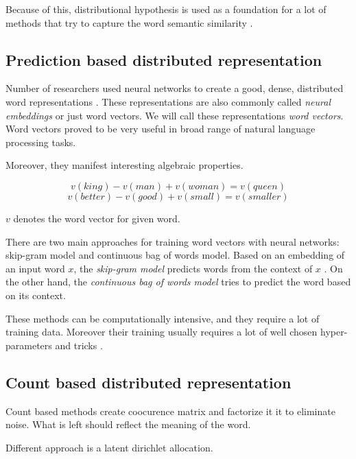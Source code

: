     Because of this, distributional hypothesis is used as a foundation for a lot of methods that try to capture the word semantic similarity \cite{rubenstein1965contextual}. 

    \subsection{Prediction based distributed representation}
    
    Number of researchers used neural networks to create a good, dense, distributed word representations \cite{pennington2014glove} \cite{DBLP:conf/icml/LeM14} \cite{rong2014word2vec}. %
    These representations are also commonly called \emph{neural embeddings} or just word vectors.
    We will call these representations \emph{word vectors}.
    Word vectors proved to be very useful in broad range of natural language processing tasks. 
    
    Moreover, they manifest interesting algebraic properties. 
    
    $$v(king) - v(man) + v(woman) = v(queen)$$
    $$v(better) - v(good) + v(small) = v(smaller)$$
    
    $v$ denotes the word vector for given word.
    
    There are two main approaches for training word vectors with neural networks: skip-gram model and continuous bag of words model.
    Based on an embedding of an input word $x$, the \textit{skip-gram model} predicts words from the context of $x$ .
    On the other hand, the \textit{continuous bag of words model} tries to predict the word based on its context.
    
    These methods can be computationally intensive, and they require a lot of training data. 
    Moreover their training usually requires a lot of well chosen hyper-parameters and tricks \cite{DBLP:journals/corr/MikolovSCCD13} \cite{vajdova2017}. %
    

    \subsection{Count based distributed representation}
    \* %
    
    Count based methods create coocurence matrix and factorize it it to eliminate noise. 
    What is left should reflect the meaning of the word. 
    
    Different approach is a latent dirichlet allocation.
    

